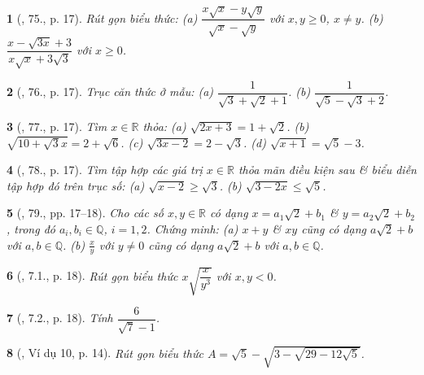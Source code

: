 \documentclass{article}
\newtheorem{baitoan}{}%
\begin{document}
\begin{baitoan}[\cite{SBT_Toan_9_tap_1}, 75., p. 17]
	Rút gọn biểu thức: (a) $\dfrac{x\sqrt{x} - y\sqrt{y}}{\sqrt{x} - \sqrt{y}}$ với $x,y\ge0$, $x\ne y$. (b) $\dfrac{x - \sqrt{3x} + 3}{x\sqrt{x} + 3\sqrt{3}}$ với $x\ge0$.
\end{baitoan}

\begin{baitoan}[\cite{SBT_Toan_9_tap_1}, 76., p. 17]
	Trục căn thức ở mẫu: (a) $\dfrac{1}{\sqrt{3} + \sqrt{2} + 1}$. (b) $\dfrac{1}{\sqrt{5} - \sqrt{3} + 2}$.
\end{baitoan}

\begin{baitoan}[\cite{SBT_Toan_9_tap_1}, 77., p. 17]
	Tìm $x\in\mathbb{R}$ thỏa: (a) $\sqrt{2x + 3} = 1 + \sqrt{2}$. (b) $\sqrt{10 + \sqrt{3}x} = 2 + \sqrt{6}$. (c) $\sqrt{3x - 2} = 2 - \sqrt{3}$. (d) $\sqrt{x + 1} = \sqrt{5} - 3$.
\end{baitoan}

\begin{baitoan}[\cite{SBT_Toan_9_tap_1}, 78., p. 17]
	Tìm tập hợp các giá trị $x\in\mathbb{R}$ thỏa mãn điều kiện sau \& biểu diễn tập hợp đó trên trục số: (a) $\sqrt{x - 2}\ge\sqrt{3}$. (b) $\sqrt{3 - 2x}\le\sqrt{5}$.
\end{baitoan}

\begin{baitoan}[\cite{SBT_Toan_9_tap_1}, 79., pp. 17--18]
	Cho các số $x,y\in\mathbb{R}$ có dạng $x = a_1\sqrt{2} + b_1$ \& $y = a_2\sqrt{2} + b_2$, trong đó $a_i,b_i\in\mathbb{Q}$, $i = 1,2$. Chứng minh: (a) $x + y$ \& $xy$ cũng có dạng $a\sqrt{2} + b$ với $a,b\in\mathbb{Q}$. (b) $\frac{x}{y}$ với $y\ne0$ cũng có dạng $a\sqrt{2} + b$ với $a,b\in\mathbb{Q}$.
\end{baitoan}

\begin{baitoan}[\cite{SBT_Toan_9_tap_1}, 7.1., p. 18]
	Rút gọn biểu thức $x\sqrt{\dfrac{x}{y^3}}$ với $x,y < 0$.
\end{baitoan}

\begin{baitoan}[\cite{SBT_Toan_9_tap_1}, 7.2., p. 18]
	Tính $\dfrac{6}{\sqrt{7} - 1}$.
\end{baitoan}

\begin{baitoan}[\cite{Binh_Toan_9_tap_1}, Ví dụ 10, p. 14]
	Rút gọn biểu thức $A = \sqrt{5} - \sqrt{3 - \sqrt{29 - 12\sqrt{5}}}$.
\end{baitoan}
\end{document}
